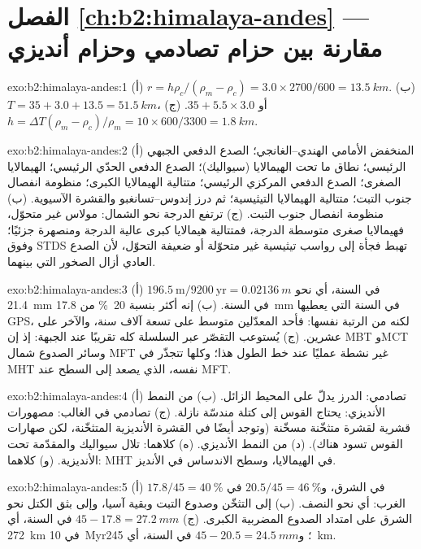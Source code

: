 \section*{الفصل \ref{ch:b2:himalaya-andes} --- مقارنة بين حزام تصادمي وحزام أنديزي}

\begin{solution}{exo:b2:himalaya-andes:1}
(أ) $r = h\rho_c/(\rho_m - \rho_c) = 3.0\times2700/600 = \qty{13.5}{km}$. (ب) $T = 35 + 3.0 +
13.5 = \qty{51.5}{km}$، أو $35 + 5.5\times3.0$. (ج) $h = \Delta T(\rho_m - \rho_c)/\rho_m =
10\times600/3300 = \qty{1.8}{km}$.
\end{solution}

\begin{solution}{exo:b2:himalaya-andes:2}
(أ) المنخفض الأمامي الهندي--الغانجي؛ الصدع الدفعي الجبهي الرئيسي؛ نطاق ما تحت الهيمالايا (سيواليك)؛ الصدع الدفعي
الحدّي الرئيسي؛ الهيمالايا الصغرى؛ الصدع الدفعي المركزي الرئيسي؛ متتالية الهيمالايا الكبرى؛ منظومة انفصال
جنوب التبت؛ متتالية الهيمالايا التيثيسية؛ ثم درز إندوس--تسانغبو والقشرة
الآسيوية. (ب) منظومة انفصال جنوب التبت. (ج) ترتفع الدرجة نحو الشمال: مولاس غير متحوّل،
فهيمالايا صغرى متوسطة الدرجة، فمتتالية هيمالايا كبرى عالية الدرجة ومنصهرة جزئيًا؛
وفوق STDS تهبط فجأة إلى رواسب تيثيسية غير متحوّلة أو ضعيفة
التحوّل، لأن الصدع العادي أزال الصخور التي بينهما.
\end{solution}

\begin{solution}{exo:b2:himalaya-andes:3}
(أ) $196.5\ \text{m}/9200\ \text{yr} = \qty{0.02136}{m}$ في السنة، أي نحو \qty{21.4}{mm} في السنة.
(ب) إنه أكثر بنسبة \qty{20}{\percent} من \qty{17.8}{mm} في السنة التي يعطيها GPS، لكنه من الرتبة نفسها:
فأحد المعدّلين متوسط على تسعة آلاف سنة، والآخر على عشرين.
(ج) يُستوعب التقصّر عبر السلسلة كله تقريبًا عند الجبهة: إذ إن MBT وMCT
وسائر الصدوع شمال MFT غير نشطة عمليًا عند خط الطول هذا؛ وكلها تتجذّر
في MHT نفسه، الذي يصعد إلى السطح عند MFT.
\end{solution}

\begin{solution}{exo:b2:himalaya-andes:4}
(أ) تصادمي: الدرز يدلّ على المحيط الزائل. (ب) من النمط الأنديزي: يحتاج القوس إلى كتلة مندسّة
نازلة. (ج) تصادمي في الغالب: مصهورات قشرية لقشرة متثخّنة مسخّنة (وتوجد
أيضًا في القشرة الأنديزية المتثخّنة، لكن صهارات القوس تسود هناك). (د) من النمط الأنديزي.
(ه) كلاهما: تلال سيواليك والمقدّمة تحت الأنديزية. (و) كلاهما: MHT في الهيمالايا،
وسطح الاندساس في الأنديز.
\end{solution}

\begin{solution}{exo:b2:himalaya-andes:5}
(أ) $17.8/45 = \qty{40}{\percent}$ في الشرق، و$20.5/45 = \qty{46}{\percent}$ في الغرب:
أي نحو النصف. (ب) إلى التثخّن وصدوع التبت وبقية آسيا، وإلى
بثق الكتل نحو الشرق على امتداد الصدوع المضربية الكبرى. (ج) $45 - 17.8 =
\qty{27.2}{mm}$ في السنة، أي \qty{272}{km} في \qty{10}{Myr}؛ و$45 - 20.5 = \qty{24.5}{mm}$ في
السنة، أي \qty{245}{km}.
\end{solution}

